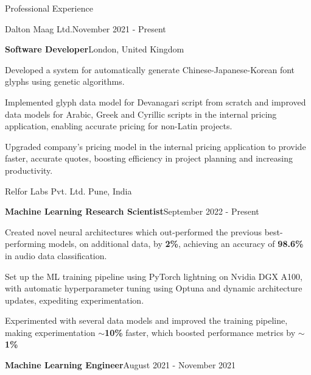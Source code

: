\documentclass{resume} %
\begin{document}
\smallskip
\smallskip
\begin{rSection}{Professional Experience}

\begin{rSubsection}{Dalton Maag Ltd.}{November 2021 - Present}{}{}
\begin{rSubsubsection}{\textbf{Software Developer}}{London, United Kingdom}{}
\item Developed a system for automatically generate Chinese-Japanese-Korean font glyphs using genetic algorithms.
\item Implemented glyph data model for Devanagari script from scratch and improved data models for Arabic, Greek and Cyrillic scripts in the internal pricing application, enabling accurate pricing for non-Latin projects.
\item Upgraded company's pricing model in the internal pricing application to provide faster, accurate quotes, boosting efficiency in project planning and increasing productivity.
\end{rSubsubsection}
\vspace{-0.4em}
\end{rSubsection}
\vspace{-0.4em}
\hdashrule[1pt]{19cm}{0.5pt}{1mm 1mm}
\begin{rSubsection}{Relfor Labs Pvt. Ltd.}
{Pune, India}{}{}
\begin{rSubsubsection}{\textbf{Machine Learning Research Scientist}}{September 2022 - Present}{}
    \item Created novel neural architectures which out-performed the previous best-performing models, on additional data, by \textbf{2\%}, achieving an accuracy of \textbf{98.6\%} in audio data classification.
    \item Set up the ML training pipeline using PyTorch lightning on Nvidia DGX A100, with automatic hyperparameter tuning using Optuna and dynamic architecture updates, expediting experimentation.
    \item Experimented with several data models and improved the training pipeline, making experimentation \textbf{$\sim$10\%} faster, which boosted performance metrics by \textbf{$\sim$1\%}
\end{rSubsubsection}\vspace{-1em}
\begin{rSubsubsection}{\textbf{Machine Learning Engineer}}{August 2021 - November 2021}{}

\end{rSubsubsection}
\end{rSubsection}
\end{rSection}
\end{document}
